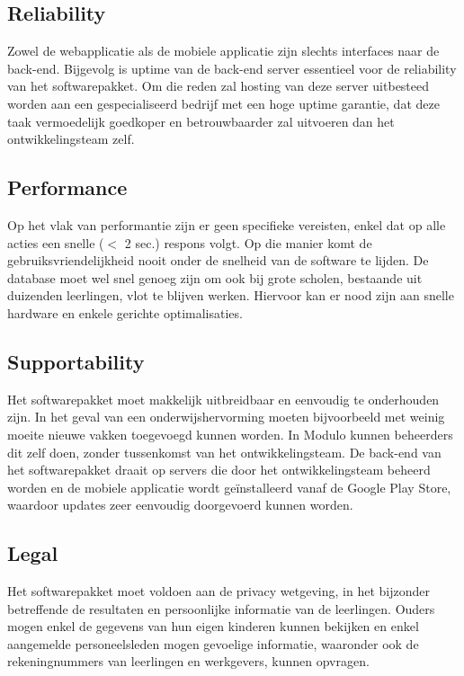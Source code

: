 \documentclass[a4paper]{article}
\begin{document}
\subsection{Reliability}
Zowel de webapplicatie als de mobiele applicatie zijn slechts interfaces naar de back-end. Bijgevolg is uptime van de back-end server essentieel voor de reliability van het softwarepakket. Om die reden zal hosting van deze server uitbesteed worden aan een gespecialiseerd bedrijf met een hoge uptime garantie, dat deze taak vermoedelijk goedkoper en betrouwbaarder zal uitvoeren dan het ontwikkelingsteam zelf.

\subsection{Performance}
Op het vlak van performantie zijn er geen specifieke vereisten, enkel dat op alle acties een snelle ($<$ 2 sec.) respons volgt. Op die manier komt de gebruiksvriendelijkheid nooit onder de snelheid van de software te lijden. De database moet wel snel genoeg zijn om ook bij grote scholen, bestaande uit duizenden leerlingen, vlot te blijven werken. Hiervoor kan er nood zijn aan snelle hardware en enkele gerichte optimalisaties.

\subsection{Supportability}
Het softwarepakket moet makkelijk uitbreidbaar en eenvoudig te onderhouden zijn. In het geval van een onderwijshervorming moeten bijvoorbeeld met weinig moeite nieuwe vakken toegevoegd kunnen worden. In Modulo kunnen beheerders dit zelf doen, zonder tussenkomst van het ontwikkelingsteam. De back-end van het softwarepakket draait op servers die door het ontwikkelingsteam beheerd worden en de mobiele applicatie wordt geïnstalleerd vanaf de Google Play Store, waardoor updates zeer eenvoudig doorgevoerd kunnen worden.

\subsection{Legal}
Het softwarepakket moet voldoen aan de privacy wetgeving, in het bijzonder betreffende de resultaten en persoonlijke informatie van de leerlingen. Ouders mogen enkel de gegevens van hun eigen kinderen kunnen bekijken en enkel aangemelde personeelsleden mogen gevoelige informatie, waaronder ook de rekeningnummers van leerlingen en werkgevers, kunnen opvragen.
\end{document}
